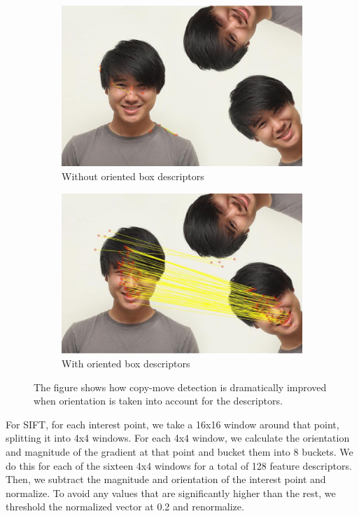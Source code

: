 \documentclass[12pt]{article}
\begin{document}
\begin{figure}
\centering
\begin{subfigure}{.5\textwidth}
  \centering
  \includegraphics[width=.8\linewidth]{./gfx/without_rotation.jpg}
  \caption{Without oriented box descriptors}
  \label{fig:sub1}
\end{subfigure}%
\begin{subfigure}{.5\textwidth}
  \centering
  \includegraphics[width=.8\linewidth]{./gfx/with_rotation.jpg}
  \caption{With oriented box descriptors}
  \label{fig:sub2}
\end{subfigure}
\caption{The figure shows how copy-move detection is dramatically improved when orientation is taken into account for the descriptors.}
\label{fig:test}
\end{figure}

For SIFT, for each interest point, we take a 16x16 window around that point, splitting it into 4x4 windows. For each 4x4 window, we calculate the orientation and magnitude of the gradient at that point and bucket them into 8 buckets. We do this for each of the sixteen 4x4 windows for a total of 128 feature descriptors. Then, we subtract the magnitude and orientation of the interest point and normalize. To avoid any values that are significantly higher than the rest, we threshold the normalized vector at 0.2 and renormalize.
\end{document}
